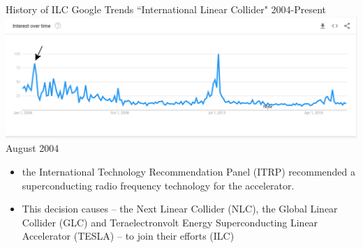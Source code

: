 \documentclass[10pt]{beamer}
\begin{document}
\begin{frame}{History of ILC}
Google Trends ``International Linear Collider" 2004-Present
\includegraphics[scale=0.25]{timeline1.png}\\
August 2004 
\begin{itemize}
\scriptsize
\item the International Technology Recommendation Panel (ITRP) recommended a superconducting radio frequency technology for the accelerator. 

\item This decision causes – the Next Linear Collider (NLC), the Global Linear Collider (GLC) and Teraelectronvolt Energy Superconducting Linear Accelerator (TESLA) -- to join their efforts (ILC)
\end{itemize}
\end{frame}
\end{document}
